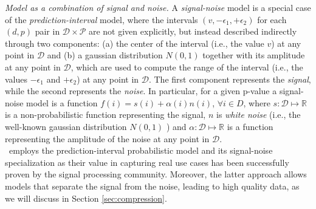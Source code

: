 \noindent \emph{Model as a combination of signal and noise.} A
\emph{signal-noise} model is a special case of the \emph{prediction-interval} model, where the intervals $(v, -\epsilon_1, +\epsilon_2)$ for each $(d, p)$ pair in $\mathcal{D} \times \mathcal{P}$ are not given explicitly, but instead described indirectly through two components: (a) the center of the interval (i.e., the value $v$) at any point in $\mathcal{D}$ and (b) a gaussian distribution $N(0,1)$ together with its amplitude at any point in $\mathcal{D}$, which are used to compute the range of the interval (i.e., the values $-\epsilon_1$ and $+\epsilon_2$) at any point in $\mathcal{D}$. The first component represents the \emph{signal}, while the second represents the \emph{noise}. In particular, for a given p-value a signal-noise model is a function $f(i) = s(i) + \alpha(i)
n(i)$, $\forall i \in D$, where $s: \mathcal{D} \mapsto \mathbb{R}$
is a non-probabilistic function representing the signal, $n$ is {\em white noise} (i.e., the well-known gaussian distribution $N(0,1)$  \cite{dsp}) and $\alpha: \mathcal{D} \mapsto \mathbb{R}$ is a function representing the amplitude of the noise at any point in $\mathcal{D}$.
 \\

\projName\ employs the prediction-interval probabilistic model and its signal-noise specialization as their value in capturing real use cases has been successfully proven by
the signal processing community. Moreover, the latter approach allows models that separate the signal from the noise, leading to high quality data,
as we will discuss in Section \ref{sec:compression}.



